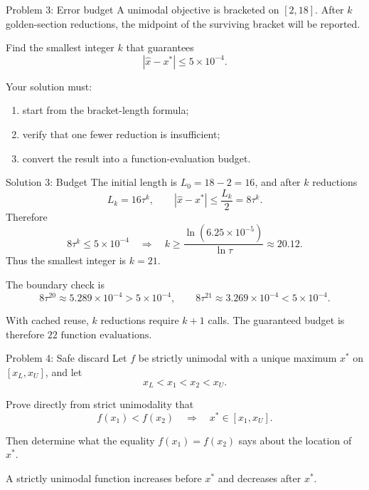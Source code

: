 \documentclass[aspectratio=169,11pt,t]{beamer}
\begin{document}
\begin{frame}{Problem 3: Error budget}
  A unimodal objective is bracketed on \([2,18]\). After \(k\) golden-section
  reductions, the midpoint of the surviving bracket will be reported.

  Find the smallest integer \(k\) that guarantees
  \[
    |\widehat{x}-x^*|\le 5\times10^{-4}.
  \]

  Your solution must:
  \begin{enumerate}
    \item start from the bracket-length formula;
    \item verify that one fewer reduction is insufficient;
    \item convert the result into a function-evaluation budget.
  \end{enumerate}
\end{frame}

\begin{frame}{Solution 3: Budget}
  The initial length is \(L_0=18-2=16\), and after \(k\) reductions
  \[
    L_k=16\tau^k,
    \qquad
    |\widehat{x}-x^*|\le\frac{L_k}{2}=8\tau^k.
  \]
  Therefore
  \[
    8\tau^k\le5\times10^{-4}
    \quad\Longrightarrow\quad
    k\ge
    \frac{\ln(6.25\times10^{-5})}{\ln\tau}
    \approx20.12.
  \]
  Thus the smallest integer is \(\boxed{k=21}\).

  The boundary check is
  \[
    8\tau^{20}\approx5.289\times10^{-4}>5\times10^{-4},
    \qquad
    8\tau^{21}\approx3.269\times10^{-4}<5\times10^{-4}.
  \]

  With cached reuse, \(k\) reductions require \(k+1\) calls. The guaranteed
  budget is therefore \(\boxed{22\text{ function evaluations}}\).
\end{frame}

\begin{frame}{Problem 4: Safe discard}
  Let \(f\) be strictly unimodal with a unique maximum \(x^*\) on
  \([x_L,x_U]\), and let
  \[
    x_L<x_1<x_2<x_U.
  \]

  Prove directly from strict unimodality that
  \[
    f(x_1)<f(x_2)
    \quad\Longrightarrow\quad
    x^*\in[x_1,x_U].
  \]

  Then determine what the equality \(f(x_1)=f(x_2)\) says about the location
  of \(x^*\).

  \begin{keyidea}
    A strictly unimodal function increases before \(x^*\) and decreases after
    \(x^*\).
  \end{keyidea}
\end{frame}
\end{document}
